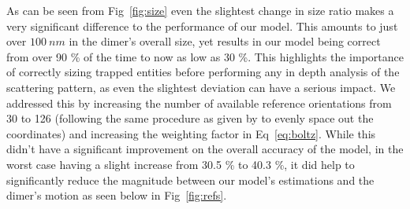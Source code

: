 As can be seen from Fig~\ref{fig:size}  even the slightest change in size ratio makes a very significant difference to the performance of our model. This amounts to just over $100 \ nm$ in the dimer's overall size, yet results in our model being correct from over 90 \% of the time to now as low as 30 \%. This highlights the importance of correctly sizing trapped entities before performing any in depth analysis of the scattering pattern, as even the slightest deviation can have a serious impact. We addressed this by increasing the number of available reference orientations from 30 to 126 (following the same procedure as given by \cite{Rey2006} to evenly space out the coordinates) and increasing the weighting factor in Eq~\ref{eq:boltz}. While this didn't have a significant improvement on the overall accuracy of the model, in the worst case having a slight increase from 30.5 \% to 40.3 \%, it did help to significantly reduce the magnitude between our model's estimations and the dimer's motion as seen below in Fig~\ref{fig:refs}.
